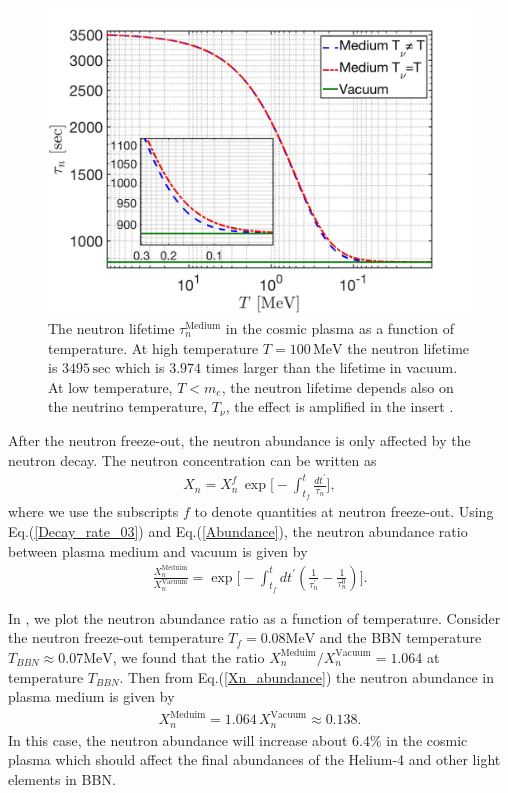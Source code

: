 \begin{figure} 
\centerline{\includegraphics[width=0.9\linewidth]{./plots/Neutron_Lifetime_001}}
\caption{The neutron lifetime $\tau_n^\mathrm{Medium}$ in the cosmic plasma as a function of temperature. At high temperature $T=100\,\mathrm{MeV}$ the neutron lifetime is $3495\,\mathrm{sec}$ which is $3.974$ times larger than the lifetime in vacuum. At low temperature, $T<m_e$, the neutron lifetime depends also on the neutrino temperature, $T_\nu$, the effect is amplified in the insert .}
\label{Decay_Rate} 
\end{figure}

After the neutron freeze-out, the neutron abundance is only affected by the neutron decay. The neutron concentration can be written as 
\begin{align}
\label{Abundance}
X_n=X_n^f\,\exp\bigg[-\int^t_{t_f}\frac{dt^\prime}{\tau_n}\bigg],
\end{align}
where we use the subscripts $f$ to denote quantities at neutron freeze-out. Using Eq.(\ref{Decay_rate_03}) and Eq.(\ref{Abundance}), the neutron abundance ratio between plasma medium and vacuum is given by
\begin{align}
\label{Abundance_Ratio}
\frac{X_n^{\mathrm{Meduim}}}{X_n^{\mathrm{Vacuum}}}=\exp\bigg[-\int^t_{t_f}dt^\prime\left(\frac{1}{\tau^\prime_n}-\frac{1}{\tau^0_n}\right)\bigg].
\end{align}

In  , we plot the neutron abundance ratio as a function of temperature. Consider the neutron freeze-out temperature $T_f=0.08\mathrm{MeV}$ and the BBN temperature $T_{BBN}\approx0.07\mathrm{MeV}$, we found that the ratio ${X_n^{\mathrm{Meduim}}}/{X_n^{\mathrm{Vacuum}}}=1.064$ at temperature $T_{BBN}$. Then from Eq.(\ref{Xn_abundance}) the neutron abundance in plasma medium is given by
\begin{align}
X_n^{\mathrm{Meduim}}=1.064\,X_n^{\mathrm{Vacuum}}\approx0.138.
\end{align}
In this case, the neutron abundance will increase about $6.4\%$ in the cosmic plasma which should affect the final abundances of the Helium-4 and other light elements in BBN.
 
